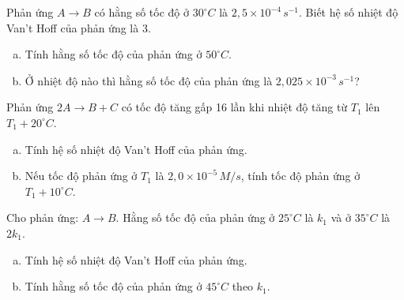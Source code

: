 \documentclass[Main.tex]{subfiles}
\begin{document}
\begin{bt}
	Phản ứng $A \rightarrow B$ có hằng số tốc độ ở $30^\circ C$ là $2{,}5 \times 10^{-4} \, s^{-1}$. Biết hệ số nhiệt độ Van't Hoff của phản ứng là $3$.
	\begin{enumerate}[a)]
		\item Tính hằng số tốc độ của phản ứng ở $50^\circ C$.
		\item Ở nhiệt độ nào thì hằng số tốc độ của phản ứng là $2{,}025 \times 10^{-3} \, s^{-1}$?
	\end{enumerate}
\end{bt}

\begin{bt}
	Phản ứng $2A \rightarrow B + C$ có tốc độ tăng gấp 16 lần khi nhiệt độ tăng từ $T_1$ lên $T_1 + 20^\circ C$.
	\begin{enumerate}[a)]
		\item Tính hệ số nhiệt độ Van't Hoff của phản ứng.
		\item Nếu tốc độ phản ứng ở $T_1$ là $2{,}0 \times 10^{-5} \, M/s$, tính tốc độ phản ứng ở $T_1 + 10^\circ C$.
	\end{enumerate}
\end{bt}

\begin{bt}
	Cho phản ứng: $A \rightarrow B$. Hằng số tốc độ của phản ứng ở $25^\circ C$ là $k_1$ và ở $35^\circ C$ là $2k_1$.
	\begin{enumerate}[a)]
		\item Tính hệ số nhiệt độ Van't Hoff của phản ứng.
		\item Tính hằng số tốc độ của phản ứng ở $45^\circ C$ theo $k_1$.
	\end{enumerate}
\end{bt}
\end{document}
